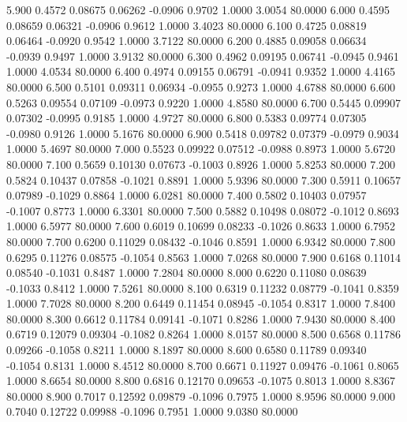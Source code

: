    5.900   0.4572   0.08675   0.06262  -0.0906   0.9702   1.0000   3.0054  80.0000
   6.000   0.4595   0.08659   0.06321  -0.0906   0.9612   1.0000   3.4023  80.0000
   6.100   0.4725   0.08819   0.06464  -0.0920   0.9542   1.0000   3.7122  80.0000
   6.200   0.4885   0.09058   0.06634  -0.0939   0.9497   1.0000   3.9132  80.0000
   6.300   0.4962   0.09195   0.06741  -0.0945   0.9461   1.0000   4.0534  80.0000
   6.400   0.4974   0.09155   0.06791  -0.0941   0.9352   1.0000   4.4165  80.0000
   6.500   0.5101   0.09311   0.06934  -0.0955   0.9273   1.0000   4.6788  80.0000
   6.600   0.5263   0.09554   0.07109  -0.0973   0.9220   1.0000   4.8580  80.0000
   6.700   0.5445   0.09907   0.07302  -0.0995   0.9185   1.0000   4.9727  80.0000
   6.800   0.5383   0.09774   0.07305  -0.0980   0.9126   1.0000   5.1676  80.0000
   6.900   0.5418   0.09782   0.07379  -0.0979   0.9034   1.0000   5.4697  80.0000
   7.000   0.5523   0.09922   0.07512  -0.0988   0.8973   1.0000   5.6720  80.0000
   7.100   0.5659   0.10130   0.07673  -0.1003   0.8926   1.0000   5.8253  80.0000
   7.200   0.5824   0.10437   0.07858  -0.1021   0.8891   1.0000   5.9396  80.0000
   7.300   0.5911   0.10657   0.07989  -0.1029   0.8864   1.0000   6.0281  80.0000
   7.400   0.5802   0.10403   0.07957  -0.1007   0.8773   1.0000   6.3301  80.0000
   7.500   0.5882   0.10498   0.08072  -0.1012   0.8693   1.0000   6.5977  80.0000
   7.600   0.6019   0.10699   0.08233  -0.1026   0.8633   1.0000   6.7952  80.0000
   7.700   0.6200   0.11029   0.08432  -0.1046   0.8591   1.0000   6.9342  80.0000
   7.800   0.6295   0.11276   0.08575  -0.1054   0.8563   1.0000   7.0268  80.0000
   7.900   0.6168   0.11014   0.08540  -0.1031   0.8487   1.0000   7.2804  80.0000
   8.000   0.6220   0.11080   0.08639  -0.1033   0.8412   1.0000   7.5261  80.0000
   8.100   0.6319   0.11232   0.08779  -0.1041   0.8359   1.0000   7.7028  80.0000
   8.200   0.6449   0.11454   0.08945  -0.1054   0.8317   1.0000   7.8400  80.0000
   8.300   0.6612   0.11784   0.09141  -0.1071   0.8286   1.0000   7.9430  80.0000
   8.400   0.6719   0.12079   0.09304  -0.1082   0.8264   1.0000   8.0157  80.0000
   8.500   0.6568   0.11786   0.09266  -0.1058   0.8211   1.0000   8.1897  80.0000
   8.600   0.6580   0.11789   0.09340  -0.1054   0.8131   1.0000   8.4512  80.0000
   8.700   0.6671   0.11927   0.09476  -0.1061   0.8065   1.0000   8.6654  80.0000
   8.800   0.6816   0.12170   0.09653  -0.1075   0.8013   1.0000   8.8367  80.0000
   8.900   0.7017   0.12592   0.09879  -0.1096   0.7975   1.0000   8.9596  80.0000
   9.000   0.7040   0.12722   0.09988  -0.1096   0.7951   1.0000   9.0380  80.0000

